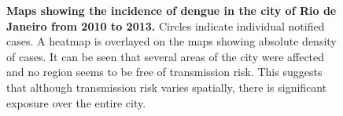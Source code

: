 \documentclass[10pt]{article}
\begin{document}
\begin{center}
\begin{figure}
  \caption{{\bf Maps showing the incidence of dengue in the city of Rio de 
Janeiro from 2010 to 2013.} Circles indicate individual notified cases. A 
heatmap is overlayed on the maps showing absolute density of cases.
It can be seen that several areas of the city were affected and no region seems 
to be free of transmission risk.
This suggests that although transmission risk varies spatially, there is 
significant exposure over the entire city.}
  \label{fig:mapas}
\end{figure}
\end{center}
\end{document}
